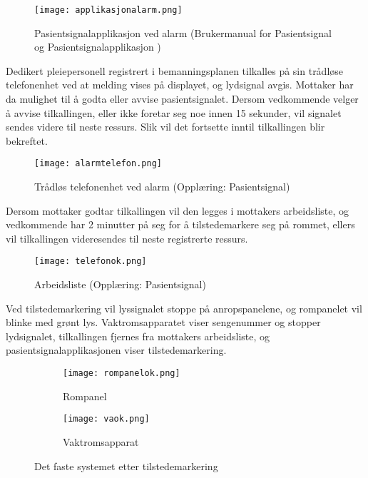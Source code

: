 \begin{figure}[H]
\centering
\texttt{[image: applikasjonalarm.png]}
\caption{Pasientsignalapplikasjon ved alarm (Brukermanual for Pasientsignal og Pasientsignalapplikasjon )}
\label{alarmprosess}
\end{figure}

\noindent
Dedikert pleiepersonell registrert i bemanningsplanen tilkalles på sin trådløse telefonenhet ved at melding vises på displayet, og lydsignal avgis. Mottaker har da mulighet til å godta eller avvise pasientsignalet. Dersom vedkommende velger å avvise tilkallingen, eller ikke foretar seg noe innen 15 sekunder, vil signalet sendes videre til neste ressurs. Slik vil det fortsette inntil tilkallingen blir bekreftet.

\begin{figure}[H]
\centering
\texttt{[image: alarmtelefon.png]}
\caption{Trådløs telefonenhet ved alarm (Opplæring: Pasientsignal)}
\label{alarmprosess}
\end{figure}

\noindent
Dersom mottaker godtar tilkallingen vil den legges i mottakers arbeidsliste, og vedkommende har 2 minutter på seg for å tilstedemarkere seg på rommet, ellers vil tilkallingen videresendes til neste registrerte ressurs.

\begin{figure}[H]
\centering
\texttt{[image: telefonok.png]}
\caption{Arbeidsliste (Opplæring: Pasientsignal)}
\label{alarmprosess}
\end{figure}

\noindent
Ved tilstedemarkering vil lyssignalet stoppe på anropspanelene, og rompanelet vil blinke med grønt lys. Vaktromsapparatet viser sengenummer og stopper lydsignalet, tilkallingen fjernes fra mottakers arbeidsliste, og pasientsignalapplikasjonen viser tilstedemarkering.
 
\begin{figure}[H]
        \centering
        \begin{subfigure}[b]{0.35\textwidth}
        		\centering
                \texttt{[image: rompanelok.png]}
                \caption{Rompanel}
                \label{rompanelok}
        \end{subfigure}
        \begin{subfigure}[b]{0.25\textwidth}
        		\centering
                \texttt{[image: vaok.png]}
                \caption{Vaktromsapparat}
                \label{vaok}
        \end{subfigure}
        \caption{Det faste systemet etter tilstedemarkering}
\end{figure} 

